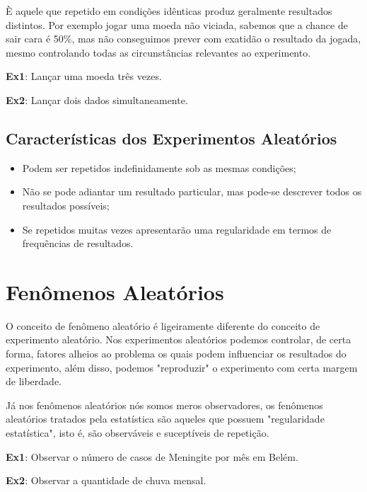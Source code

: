È aquele que repetido em condições idênticas produz geralmente
resultados distintos. Por exemplo jogar uma moeda não viciada,
sabemos que a chance de sair cara é 50\%, mas não conseguimos
prever com exatidão o resultado da jogada, mesmo controlando todas
as circunstâncias relevantes ao experimento.\vskip0.3cm


\textbf{Ex1}: Lançar uma moeda três vezes. \vskip0.3cm

\textbf{Ex2}: Lançar dois dados simultaneamente. \vskip0.3cm

\subsection{Características dos Experimentos Aleatórios}


\begin{itemize}
    \item Podem ser repetidos indefinidamente sob as mesmas
   condições;
   \item Não se pode adiantar um resultado particular, mas
    pode-se descrever todos os resultados possíveis;
    \item Se repetidos muitas vezes apresentarão uma regularidade
    em termos de frequências de resultados.
\end{itemize}


\section{Fenômenos Aleatórios}

O conceito de fenômeno aleatório é ligeiramente diferente do
conceito de experimento aleatório. Nos experimentos aleatórios
podemos controlar, de certa forma, fatores alheios ao problema os
quais podem influenciar os resultados do experimento, além disso,
podemos "reproduzir" o experimento com certa margem de
liberdade.\vskip0.3cm

Já nos fenômenos aleatórios nós somos meros observadores, os
fenômenos aleatórios tratados pela estatística são aqueles que
possuem "regularidade estatística", isto é, são observáveis e
suceptíveis de repetição.\vskip0.3cm

\textbf{Ex1}: Observar o número de casos de Meningite por mês em
Belém. \vskip0.3cm

\textbf{Ex2}: Observar a quantidade de chuva mensal.\vskip0.3cm


